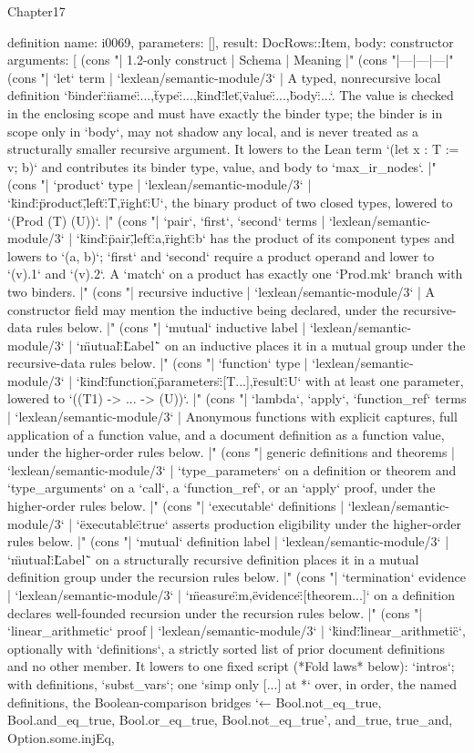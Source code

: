 \begin{lexlean}{Chapter17}
\begin{semanticmodule}
definition{
  name: i0069,
  parameters: [],
  result: DocRows::Item,
  body: constructor{
    arguments: [
      (cons "| 1.2-only construct | Schema | Meaning |" (cons "|---|---|---|" (cons "| `let` term | `lexlean/semantic-module/3` | A typed, nonrecursive local definition `{\"binder\":{\"name\":...,\"type\":...},\"kind\":\"let\",\"value\":...,\"body\":...}`. The value is checked in the enclosing scope and must have exactly the binder type; the binder is in scope only in `body`, may not shadow any local, and is never treated as a structurally smaller recursive argument. It lowers to the Lean term `(let x : T := v; b)` and contributes its binder type, value, and body to `max_ir_nodes`. |" (cons "| `product` type | `lexlean/semantic-module/3` | `{\"kind\":\"product\",\"left\":T,\"right\":U}`, the binary product of two closed types, lowered to `(Prod (T) (U))`. |" (cons "| `pair`, `first`, `second` terms | `lexlean/semantic-module/3` | `{\"kind\":\"pair\",\"left\":a,\"right\":b}` has the product of its component types and lowers to `(a, b)`; `first` and `second` require a product operand and lower to `(v).1` and `(v).2`. A `match` on a product has exactly one `Prod.mk` branch with two binders. |" (cons "| recursive inductive | `lexlean/semantic-module/3` | A constructor field may mention the inductive being declared, under the recursive-data rules below. |" (cons "| `mutual` inductive label | `lexlean/semantic-module/3` | `\"mutual\":\"Label\"` on an inductive places it in a mutual group under the recursive-data rules below. |" (cons "| `function` type | `lexlean/semantic-module/3` | `{\"kind\":\"function\",\"parameters\":[T...],\"result\":U}` with at least one parameter, lowered to `((T1) -> ... -> (U))`. |" (cons "| `lambda`, `apply`, `function_ref` terms | `lexlean/semantic-module/3` | Anonymous functions with explicit captures, full application of a function value, and a document definition as a function value, under the higher-order rules below. |" (cons "| generic definitions and theorems | `lexlean/semantic-module/3` | `type_parameters` on a definition or theorem and `type_arguments` on a `call`, a `function_ref`, or an `apply` proof, under the higher-order rules below. |" (cons "| `executable` definitions | `lexlean/semantic-module/3` | `\"executable\":true` asserts production eligibility under the higher-order rules below. |" (cons "| `mutual` definition label | `lexlean/semantic-module/3` | `\"mutual\":\"Label\"` on a structurally recursive definition places it in a mutual definition group under the recursion rules below. |" (cons "| `termination` evidence | `lexlean/semantic-module/3` | `{\"measure\":m,\"evidence\":[theorem...]}` on a definition declares well-founded recursion under the recursion rules below. |" (cons "| `linear_arithmetic` proof | `lexlean/semantic-module/3` | `{\"kind\":\"linear_arithmetic\"}`, optionally with `definitions`, a strictly sorted list of prior document definitions and no other member. It lowers to one fixed script (*Fold laws* below): `intros`; with definitions, `subst_vars`; one `simp only [...] at *` over, in order, the named definitions, the Boolean-comparison bridges `← Bool.not_eq_true, Bool.and_eq_true, Bool.or_eq_true, Bool.not_eq_true', and_true, true_and, Option.some.injEq, }}
\end{semanticmodule}
\end{lexlean}

